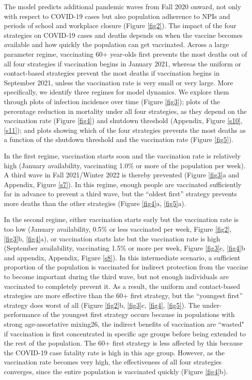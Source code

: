 The model predicts additional pandemic waves from Fall 2020 onward, not only with respect to COVID-19 cases but also population adherence to NPIs and periods of school and workplace closure (Figure \ref{fig2}). The impact of the four strategies on COVID-19 cases and deaths depends on when the vaccine becomes available and how quickly the population can get vaccinated. Across a large parameter regime, vaccinating 60+ year-olds first prevents the most deaths out of all four strategies if vaccination begins in January 2021, whereas the uniform or contact-based strategies prevent the most deaths if vaccination begins in September 2021, unless the vaccination rate is very small or very large. More specifically, we identify three regimes for model dynamics. We explore them through plots of infection incidence over time (Figure \ref{fig3}); plots of the percentage reduction in mortality under all four strategies, as they depend on the vaccination rate (Figure \ref{fig4}) and shutdown threshold (Appendix, Figure \ref{s10}, \ref{s11}); and plots showing which of the four strategies prevents the most deaths as a function of the shutdown threshold and the vaccination rate (Figure \ref{fig5}). 

In the first regime, vaccination starts soon and the vaccination rate is relatively high (January availability, vaccinating 1.0\% or more of the population per week). A third wave in Fall 2021/Winter 2022 is thereby prevented (Figure \ref{fig3}a and Appendix, Figure \ref{s7}).  In this regime, enough people are vaccinated sufficiently far in advance to prevent a third wave, but the “oldest first” strategy prevents more deaths than the other strategies (Figure \ref{fig4}a, \ref{fig5}a). 

In the second regime, either vaccination starts early but the vaccination rate is too low (January availability, 0.5\% or less vaccinated per week, Figure \ref{fig2}, \ref{fig3}b, \ref{fig4}a), or vaccination starts late but the vaccination rate is high (September availability, vaccinating 1.5\% or more per week, Figure \ref{fig3}c, \ref{fig4}b and appendix, Appendix, Figure \ref{s8}).  In this intermediate scenario, a sufficient proportion of the population is vaccinated for indirect protection from the vaccine to become important during the third wave, but not enough individuals are vaccinated to completely prevent it.  As a result, the uniform and contact-based strategies are more effective than the 60+ first strategy, but the “youngest first” strategy does worst of all (Figure \ref{fig2}b, \ref{fig3}c, \ref{fig4}, \ref{fig5}).  The under-performance of the youngest first strategy occurs because in populations with strong age-assortative mixing26, the indirect benefits of vaccination are “wasted" if vaccination is first concentrated in specific age groups before being extended to the rest of the population.  The 60+ first strategy is less affected by this because the COVID-19 case fatality rate is high in this age group. However, as the vaccination rate becomes very high, the effectiveness of all four strategies converges, since the entire population is vaccinated quickly (Figure \ref{fig4}b).

